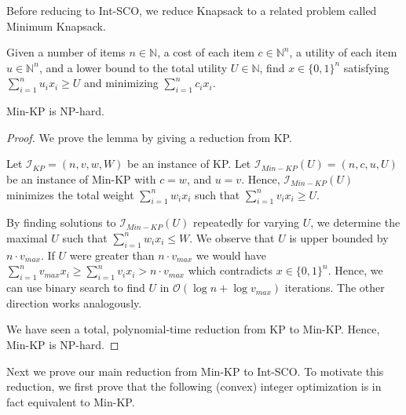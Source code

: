 Before reducing to Int-SCO, we reduce Knapsack to a related problem called Minimum Knapsack.

\begin{problem}
Given a number of items $n \in \mathbb{N}$, a cost of each item $c \in \mathbb{N}^n$, a utility of each item $u \in \mathbb{N}^n$, and a lower bound to the total utility $U \in \mathbb{N}$, find $x \in \{0,1\}^n$ satisfying $\sum_{i = 1}^n u_i x_i \geq U$ and minimizing $\sum_{i=1}^n c_i x_i$.
\end{problem}

\begin{lemma}
Min-KP is NP-hard.
\end{lemma}
\begin{proof}
We prove the lemma by giving a reduction from KP.

Let $\mathcal{I}_{KP} = (n, v, w, W)$ be an instance of KP. Let $\mathcal{I}_{Min-KP}(U) = (n, c, u, U)$ be an instance of Min-KP with $c = w$, and $u = v$. Hence, $\mathcal{I}_{Min-KP}(U)$ minimizes the total weight $\sum_{i=1}^n w_i x_i$ such that $\sum_{i=1}^n v_i x_i \geq U$.

By finding solutions to $\mathcal{I}_{Min-KP}(U)$ repeatedly for varying $U$, we determine the maximal $U$ such that $\sum_{i=1}^n w_i x_i \leq W$. We observe that $U$ is upper bounded by $n \cdot v_{max}$. If $U$ were greater than $n \cdot v_{max}$ we would have $\sum_{i=1}^n v_{max} x_i \geq \sum_{i=1}^n v_i x_i > n \cdot v_{max}$ which contradicts $x \in \{0,1\}^n$. Hence, we can use binary search to find $U$ in $\mathcal{O}(\log n + \log v_{max})$ iterations. The other direction works analogously.

We have seen a total, polynomial-time reduction from KP to Min-KP. Hence, Min-KP is NP-hard.
\end{proof}

Next we prove our main reduction from Min-KP to Int-SCO. To motivate this reduction, we first prove that the following (convex) integer optimization is in fact equivalent to Min-KP.

